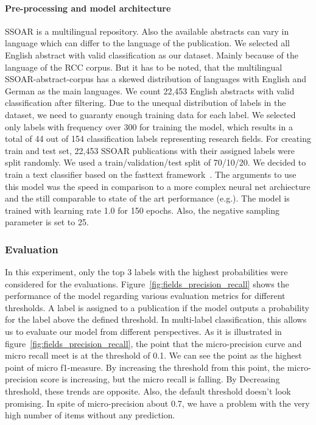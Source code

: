 \paragraph{Pre-processing and model architecture}
SSOAR is a multilingual repository.
Also the available abstracts can vary in language which can differ to the language of the publication.
We selected all English abstract with valid classification as our dataset.
Mainly because of the language of the RCC corpus.
But it has to be noted, that the multilingual SSOAR-abstract-corpus has a skewed distribution of languages with English and German as the main languages.
We count 22,453 English abstracts with valid classification after filtering.
Due to the unequal distribution of labels in the dataset, we need to guaranty enough training data for each label.
We selected only labels with frequency over 300 for training the model, which results in a total of 44 out of 154 classification labels representing research fields.
For creating train and test set, 22,453 SSOAR publications with their assigned labels were split randomly.
We used a train/validation/test split of 70/10/20.
We decided to train a text classifier based on the fasttext framework~\cite{joulin2017bag}.
The arguments to use this model was the speed in comparison to a more complex neural net archiecture and the still comparable to state of the art performance (e.g.\cite{wang2018joint}).
The model is trained with learning rate 1.0 for 150 epochs.
Also, the negative sampling parameter is set to 25.


\subsubsection{Evaluation}
In this experiment, only the top 3 labels with the highest probabilities were considered for the evaluations.
Figure~\ref{fig:fields_precision_recall} shows the performance of the model regarding various evaluation metrics for different thresholds.
A label is assigned to a publication if the model outputs a probability for the label above the defined threshold.
In multi-label classification, this allows us to evaluate our model from different perspectives. 
As it is illustrated in figure~\ref{fig:fields_precision_recall}, the point that the micro-precision curve and micro recall meet is at the threshold of 0.1.
We can see the point as the highest point of micro f1-measure. By increasing the threshold from this point, the micro-precision score is increasing, but the micro recall is falling. By Decreasing threshold, these trends are opposite.  Also, the default threshold doesn't look promising. In spite of micro-precision about 0.7, we have a problem with the very high number of items without any prediction. 

